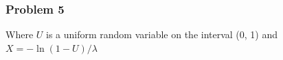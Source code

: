 \documentclass[11pt]{extarticle}
\begin{document}
\begin{enumerate}[(a)]








\end{enumerate}


\subsubsection*{Problem 5}


Where $U$ is a uniform random variable on the interval (0, 1) and $ X = -\ln(1-U)/\lambda $
\end{document}
